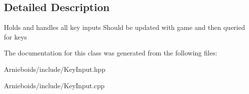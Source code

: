 \subsection{Detailed Description}
Holds and handles all key inputs Should be updated with game and then queried for keys 

The documentation for this class was generated from the following files\+:\begin{DoxyCompactItemize}
\item 
Arnieboids/include/Key\+Input.\+hpp\item 
Arnieboids/include/Key\+Input.\+cpp\end{DoxyCompactItemize}
